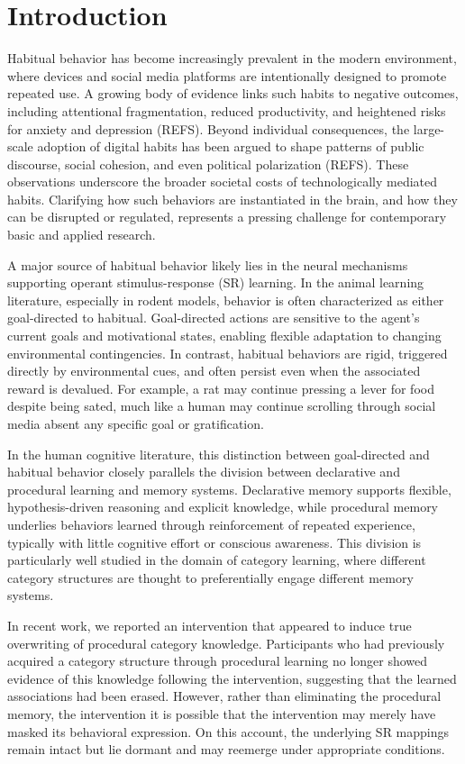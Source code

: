 \documentclass{article}
\begin{document}
\section{Introduction}
Habitual behavior has become increasingly prevalent in the
modern environment, where devices and social media platforms
are intentionally designed to promote repeated use. A
growing body of evidence links such habits to negative
outcomes, including attentional fragmentation, reduced
productivity, and heightened risks for anxiety and
depression (REFS).  Beyond individual consequences, the
large-scale adoption of digital habits has been argued to
shape patterns of public discourse, social cohesion, and
even political polarization (REFS). These observations
underscore the broader societal costs of technologically
mediated habits.  Clarifying how such behaviors are
instantiated in the brain, and how they can be disrupted or
regulated, represents a pressing challenge for contemporary
basic and applied research.

A major source of habitual behavior likely lies in the
neural mechanisms supporting operant stimulus-response (SR)
learning. In the animal learning literature, especially in
rodent models, behavior is often characterized as either
goal-directed to habitual. Goal-directed actions are
sensitive to the agent's current goals and motivational
states, enabling flexible adaptation to changing
environmental contingencies. In contrast, habitual behaviors
are rigid, triggered directly by environmental cues, and
often persist even when the associated reward is devalued.
For example, a rat may continue pressing a lever for food
despite being sated, much like a human may continue
scrolling through social media absent any specific goal or
gratification.

In the human cognitive literature, this distinction between
goal-directed and habitual behavior closely parallels the
division between declarative and procedural learning and
memory systems. Declarative memory supports flexible,
hypothesis-driven reasoning and explicit knowledge, while
procedural memory underlies behaviors learned through
reinforcement of repeated experience, typically with little
cognitive effort or conscious awareness. This division is
particularly well studied in the domain of category
learning, where different category structures are thought to
preferentially engage different memory systems.

In recent work, we reported an intervention that appeared to
induce true overwriting of procedural category knowledge.
Participants who had previously acquired a category
structure through procedural learning no longer showed
evidence of this knowledge following the intervention,
suggesting that the learned associations had been erased.
However, rather than eliminating the procedural memory, the
intervention it is possible that the intervention may merely
have masked its behavioral expression. On this account, the
underlying SR mappings remain intact but lie dormant and may
reemerge under appropriate conditions.
\end{document}
